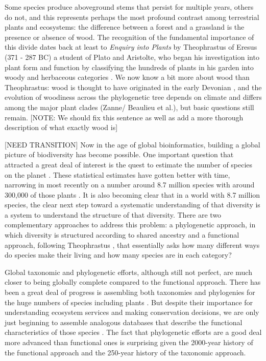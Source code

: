 \documentclass[12pt]{article}
\begin{document}
Some species produce aboveground stems that persist for multiple years, others do not, and this represents perhaps the most profound contrast among terrestrial plants and ecosystems: the difference between a forest and a grassland is the presence or absence of wood. The recognition of the fundamental importance of this divide dates back at least to \textit{Enquiry into Plants} by Theophrastus of Eresus (371 - 287 BC) a student of Plato and Aristolte, who began his investigation into plant form and function by classifying the hundreds of plants in his garden into woody and herbaceous categories \citep{theophrastus1916enquiry}.  We now know a bit more about wood than Theophrastus: wood is thought to have originated in the early Devonian \citep[~400 mya;][]{gerrienne2011simple}, and the evolution of woodiness across the phylogenetic tree depends on climate and differs among the major plant clades (Zanne/ Beaulieu et al.), but basic questions still remain. [NOTE: We should fix this sentence as well as add a more thorough description of what exactly wood is]

[NEED TRANSITION] Now in the age of global bioinformatics, building a global picture of biodiversity has become possible.  One important question that attracted a great deal of interest is the quest to estimate the number of species on the planet \citep{may1988many,erwin1991many, stork1993many, mora2011plos}.  These statistical estimates have gotten better with time, narrowing in most recently on a number around 8.7 million species with around 300,000 of those plants \citep{mora2011plos}.  It is also becoming clear that in a world with 8.7 million species, the clear next step toward a systematic understanding of that diversity is a system to understand the structure of that diversity. There are two complementary approaches to address this problem: a phylogenetic approach, in which diversity is structured according to shared ancestry and a functional approach, following Theophrastus \citep[more recently in the tradition of][]{grime1979plant, weiher2009challenging, westoby2002plant}, that essentially asks how many different ways do species make their living and how many species are in each category?

Global taxonomic and phylogenetic efforts, although still not perfect, are much closer to being globally complete compared to the functional approach.   There has been a great deal of progress is assembling both taxonomies and phylogenies for the huge numbers of species including plants \citep[e.g.][]{smith2011understanding}. But despite their importance for understanding ecosystem services and making conservation decisions, we are only just beginning to assemble analogous databases that describe the functional characteristics of those species \citep{Kattge2011TRY}. The fact that phylogenetic efforts are a good deal more advanced than functional ones is surprising given the 2000-year history of the functional approach and the 250-year history of the taxonomic approach.  
\end{document}
